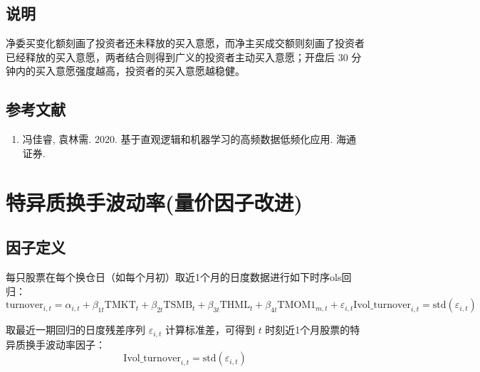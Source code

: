 \documentclass{article}
\begin{document}
\subsection{说明}
净委买变化额刻画了投资者还未释放的买入意愿，而净主买成交额则刻画了投资者已经释放的买入意愿，两者结合则得到广义的投资者主动买入意愿；开盘后 30 分钟内的买入意愿强度越高，投资者的买入意愿越稳健。

\subsection{参考文献}
\begin{enumerate}
    \item 冯佳睿, 袁林需. 2020. 基于直观逻辑和机器学习的高频数据低频化应用. 海通证券.
\end{enumerate}

\section{特异质换手波动率(量价因子改进)}

\subsection{因子定义}
每只股票在每个换仓日（如每个月初）取近1个月的日度数据进行如下时序ols回归：
\begin{equation}
    \mathrm{turnover}_{i,t} = \alpha_{i,t} + \beta_{1t} \mathrm{TMKT}_t + \beta_{2t} \mathrm{TSMB}_t + \beta_{3t} \mathrm{THML}_t + \beta_{4t} \mathrm{TMOM1}_{m,t} + 
 
     \varepsilon_{i,t}\mathrm{Ivol\_turnover}_{i,t} = \mathrm{std}(\varepsilon_{i,t})
\end{equation}

取最近一期回归的日度残差序列 \( \varepsilon_{i,t} \) 计算标准差，可得到 \( t \) 时刻近1个月股票的特异质换手波动率因子：
\begin{equation}
    \mathrm{Ivol\_turnover}_{i,t} = \mathrm{std}(\varepsilon_{i,t})
\end{equation}
\end{document}
